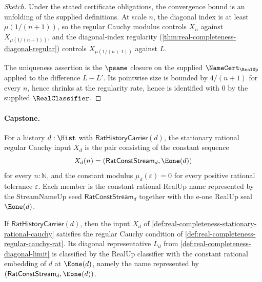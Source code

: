 \begin{proof}[Sketch]
Under the stated certificate obligations, the convergence bound is an unfolding of the supplied definitions. At scale $n$, the diagonal index is at least $\mu(1/(n+1))$, so the regular Cauchy modulus controls $X_n$ against $X_{\mu(1/(n+1))}$, and the diagonal-index regularity (\autoref{thm:real-completeness-diagonal-regular}) controls $X_{\mu(1/(n+1))}$ against $L$.

The uniqueness assertion is the $\psame$ closure on the supplied $\NameCert_{\RealUp}$ applied to the difference $L - L'$. Its pointwise size is bounded by $4/(n+1)$ for every $n$, hence shrinks at the regularity rate, hence is identified with $0$ by the supplied $\RealClassifier$.
\end{proof}

\paragraph{Capstone.}
\begin{definition}
\label{def:real-completeness-stationary-rational-cauchy}
For a history $d:\Hist$ with $\mathsf{RatHistoryCarrier}(d)$, the stationary rational regular Cauchy input $X_d$ is the pair consisting of the constant sequence
$$
X_d(n)=(\mathsf{RatConstStream}_d,\Eone(d))
$$
for every $n:\mathbb{N}$, and the constant modulus $\mu_d(\varepsilon)=0$ for every positive rational tolerance $\varepsilon$. Each member is the constant rational RealUp name represented by the StreamNameUp seed $\mathsf{RatConstStream}_d$ together with the e-one RealUp seal $\Eone(d)$.
\end{definition}

\begin{theorem}
\label{thm:real-completeness-stationary-rational-diagonal}
If $\mathsf{RatHistoryCarrier}(d)$, then the input $X_d$ of \autoref{def:real-completeness-stationary-rational-cauchy} satisfies the regular Cauchy condition of \autoref{def:real-completeness-regular-cauchy-rat}. Its diagonal representative $L_d$ from \autoref{def:real-completeness-diagonal-limit} is classified by the RealUp classifier with the constant rational embedding of $d$ at $\Eone(d)$, namely the name represented by $(\mathsf{RatConstStream}_d,\Eone(d))$.
\end{theorem}

